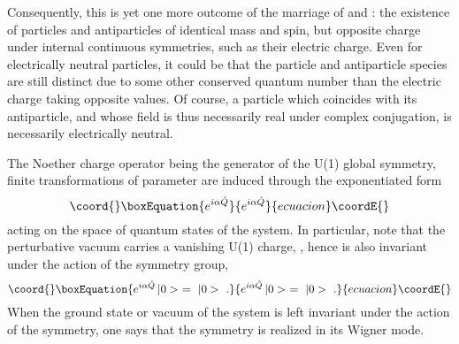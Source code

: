 \documentclass[a4paper,11pt]{article}
\begin{document}
Consequently, this is yet one more
outcome of the marriage of \myHighlight{$\hbar$}\coordHE{} and \coordHE{}: the existence of particles and
antiparticles of identical mass and spin, but opposite charge under internal
continuous symmetries, such as their electric charge. Even for electrically
neutral particles, it could be that the particle and antiparticle species
are still distinct due to some other conserved quantum number than the
electric charge taking opposite values. Of course, a particle which coincides
with its antiparticle, and whose field is thus necessarily real under
complex conjugation, is necessarily electrically neutral.

The Noether charge operator \coordHE{} being the generator of the U(1)
global symmetry, finite transformations of parameter \myHighlight{$\alpha$}\coordHE{} are induced 
through the exponentiated form
\begin{equation}\coord{}\boxEquation{
e^{i\alpha\hat{Q}}
}{
e^{i\alpha\hat{Q}}
}{ecuacion}\coordE{}\end{equation}
acting on the space of quantum states of the system. In particular, note
that the perturbative vacuum \coordHE{} carries a vanishing U(1) charge,
\coordHE{}, hence is also invariant under the action of the symmetry
group,
\begin{equation}\coord{}\boxEquation{
e^{i\alpha\hat{Q}}\,|0>\ =\ |0>\ .
}{
e^{i\alpha\hat{Q}}\,|0>\ =\ |0>\ .
}{ecuacion}\coordE{}\end{equation}
When the ground state or vacuum of the system is left invariant under the
action of the symmetry, one says that the symmetry is realized in its
Wigner mode.
\end{document}
